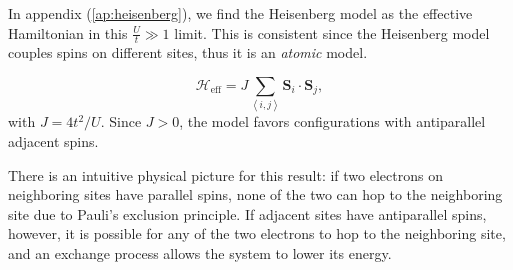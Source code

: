 In appendix (\ref{ap:heisenberg}), we find the Heisenberg model as the effective Hamiltonian in this $\frac{U}{t} \gg 1$ limit.
This is consistent since the Heisenberg model couples spins on different sites, thus it is an \emph{atomic} model.

\begin{equation}
\mathcal{H}_{\text{eff}} = J \sum_{\left\langle i, j \right\rangle} \bm S_i \cdot \bm S_j ,
\end{equation}
with $J = 4 t^2 / U$.
Since $J > 0$, the model favors configurations with antiparallel adjacent spins.

There is an intuitive physical picture for this result: if two electrons on neighboring sites have parallel spins, none of the two can hop to the neighboring site due to Pauli's exclusion principle.
If adjacent sites have antiparallel spins, however, it is possible for any of the two electrons to hop to the neighboring site, and an exchange  process allows the system to lower its energy.